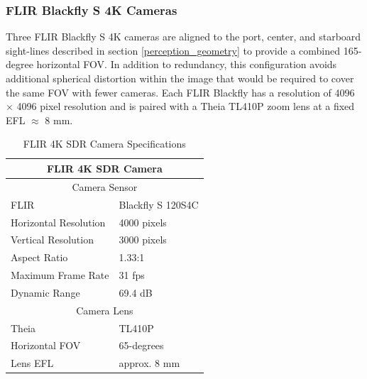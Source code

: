 \documentclass{erauthesis}
\begin{document}
\subsubsection{FLIR Blackfly S 4K Cameras} \label{sensors_FLIR}

Three FLIR Blackfly S 4K cameras are aligned to the port, center, and starboard sight-lines described in section \ref{perception_geometry} to provide a combined 165-degree horizontal \ac{FOV}.
In addition to redundancy, this configuration avoids additional spherical distortion within the image that would be required to cover the same \ac{FOV} with fewer cameras.
Each FLIR Blackfly has a resolution of 4096 $\times$ 4096 pixel resolution and is paired with a Theia TL410P zoom lens at a fixed \ac{EFL} $\approx$ 8 mm.


\begin{table}[htbp]
\centering
\begin{tabular}{ll}
\hline
\multicolumn{2}{c}{FLIR 4K SDR Camera}\\
\hline
\hline
\multicolumn{2}{c}{Camera Sensor}\\
\hline
FLIR & Blackfly S 120S4C \\
Horizontal Resolution & 4000 pixels \\
Vertical Resolution & 3000 pixels \\
Aspect Ratio & 1.33:1 \\
Maximum Frame Rate & 31 fps \\
Dynamic Range & 69.4 dB \\
\multicolumn{2}{c}{Camera Lens}\\
\hline
Theia & TL410P\\
Horizontal \Ac{FOV} & 65-degrees\\
Lens \Ac{EFL} & approx. 8 mm\\
\hline
\end{tabular}
\caption{FLIR 4K SDR Camera Specifications}
\label{table:SDR_camera_specs}
\end{table}
\end{document}
